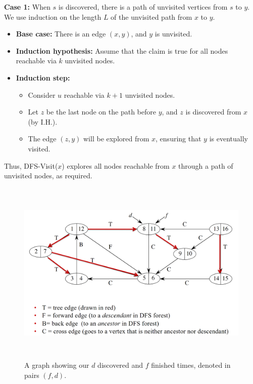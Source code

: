     \begin{Proof}

        \textbf{Case 1:} When $s$ is discovered, there is a path of unvisited vertices from $s$ to $y$. We use induction on the length $L$ of the unvisited path from $x$ to $y$.
        \begin{itemize}
            \item \textbf{Base case:} There is an edge $(x, y)$, and $y$ is unvisited.
            \item \textbf{Induction hypothesis:} Assume that the claim is true for all nodes reachable via $k$ unvisited nodes.
            \item \textbf{Induction step:}
            \begin{itemize}
                \item Consider $u$ reachable via $k + 1$ unvisited nodes.
                \item Let $z$ be the last node on the path before $y$, and $z$ is discovered from $x$ (by I.H.).
                \item The edge $(z, y)$ will be explored from $x$, ensuring that $y$ is eventually visited.
            \end{itemize}
        \end{itemize}
        \noindent
        Thus, DFS-Visit($x$) explores all nodes reachable from $x$ through a path of unvisited nodes, as required.
        \end{Proof}

\begin{figure}[h]
    \begin{center}
      \includegraphics[height=3.5in]{./Sections/graphs/dfs.png}
    \end{center}
     \caption{A graph showing our $d$ discovered and $f$ finished times, denoted in pairs $(f,d)$.}\label{fig:dfs}
  \end{figure}

